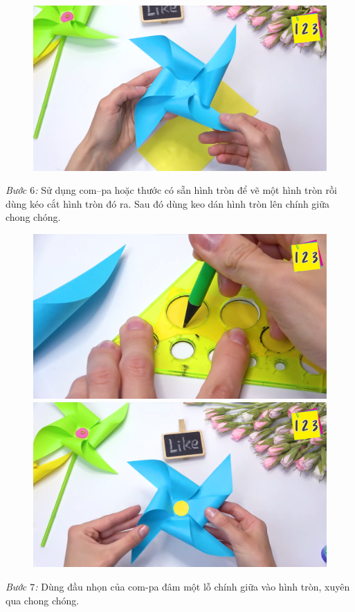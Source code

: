 \begin{multicols}{2}
\begin{figure}[H]
	\includegraphics[width= 0.75\linewidth]{5d}
	\vspace*{-10pt}
\end{figure}
	\textit{Bước $6$:} Sử dụng com--pa hoặc thước có sẵn hình tròn để vẽ một hình tròn rồi dùng kéo cắt hình tròn đó ra. Sau đó dùng keo dán hình tròn lên chính giữa chong chóng.
	\begin{figure}[H]
		\vspace*{-5pt}
		\centering
		\captionsetup{labelformat= empty, justification=centering}
		\includegraphics[width= 0.75\linewidth]{6a}
		\includegraphics[width= 0.75\linewidth]{6b}
		\vspace*{-10pt}
	\end{figure}
	\textit{Bước $7$:} Dùng đầu nhọn của com-pa đâm một lỗ chính giữa vào hình tròn, xuyên qua chong chóng.
	\begin{figure}[H]

\end{figure}
\end{multicols}
